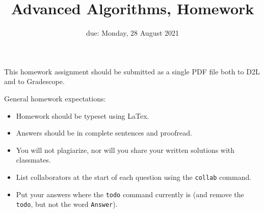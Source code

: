 \documentclass{article}
\title{Advanced Algorithms, Homework \hwnum}
\author{\todo{Your Name Here}}
\date{due: Monday, 28 August 2021}
\begin{document}
\maketitle

This homework assignment should be
submitted as a single PDF file both to D2L and to Gradescope.

General homework expectations:
\begin{itemize}
    \item Homework should be typeset using LaTex.
    \item Answers should be in complete sentences and proofread.
    \item You will not plagiarize, nor will you share your written solutions
        with classmates.
    \item List collaborators at the start of each question using the
        \texttt{collab} command.
    \item Put your answers where the \texttt{todo} command currently is (and
        remove the \texttt{todo}, but not the word \texttt{Answer}).
\end{itemize}

\end{document}
